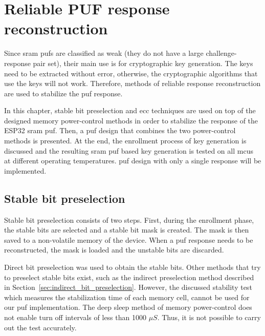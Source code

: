 \chapter{Reliable PUF response reconstruction}\label{sec:response_extraction} %

Since \gls{sram} \glspl{puf} are classified as weak (they do not have a large challenge-response pair set), their main use is for cryptographic key generation. The keys need to be extracted without error, otherwise, the cryptographic algorithms that use the keys will not work. Therefore, methods of reliable response reconstruction are used to stabilize the \gls{puf} response.

In this chapter, stable bit preselection and \gls{ecc} techniques are used on top of the designed memory power-control methods in order to stabilize the response of the ESP32 \gls{sram} \gls{puf}. Then, a \gls{puf} design that combines the two power-control methods is presented. At the end, the enrollment process of key generation is discussed and the resulting \gls{sram} \gls{puf} based key generation is tested on all \glspl{mcu} at different operating temperatures. \gls{puf} design with only a single response will be implemented.

\section{Stable bit preselection}

Stable bit preselection consists of two steps. First, during the enrollment phase, the stable bits are selected and a stable bit mask is created. The mask is then saved to a non-volatile memory of the device. When a \gls{puf} response needs to be reconstructed, the mask is loaded and the unstable bits are discarded.

Direct bit preselection was used to obtain the stable bits. Other methods that try to preselect stable bits exist, such as the indirect preselection method described in Section~\ref{sec:indirect_bit_preselection}. However, the discussed stability test which measures the stabilization time of each memory cell, cannot be used for our \gls{puf} implementation. The deep sleep method of memory power-control does not enable turn off intervals of less than 1000 $\mu{}S$. Thus, it is not possible to carry out the test accurately.

